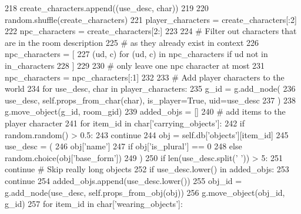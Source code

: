 \begin{DoxyCode}
218             create\_characters.append((use\_desc, char))
219 
220         random.shuffle(create\_characters)
221         player\_characters = create\_characters[:2]
222         npc\_characters = create\_characters[2:]
223 
224         \textcolor{comment}{# Filter out characters that are in the room description}
225         \textcolor{comment}{# as they already exist in context}
226         npc\_characters = [
227             (ud, c) \textcolor{keywordflow}{for} (ud, c) \textcolor{keywordflow}{in} npc\_characters \textcolor{keywordflow}{if} ud \textcolor{keywordflow}{not} \textcolor{keywordflow}{in} in\_characters
228         ]
229 
230         \textcolor{comment}{# only leave one npc character at most}
231         npc\_characters = npc\_characters[:1]
232 
233         \textcolor{comment}{# Add player characters to the world}
234         \textcolor{keywordflow}{for} use\_desc, char \textcolor{keywordflow}{in} player\_characters:
235             g\_id = g.add\_node(
236                 use\_desc, self.props\_from\_char(char), is\_player=\textcolor{keyword}{True}, uid=use\_desc
237             )
238             g.move\_object(g\_id, room\_gid)
239             added\_objs = []
240             \textcolor{comment}{# add items to the player character}
241             \textcolor{keywordflow}{for} item\_id \textcolor{keywordflow}{in} char[\textcolor{stringliteral}{'carrying\_objects'}]:
242                 \textcolor{keywordflow}{if} random.random() > 0.5:
243                     \textcolor{keywordflow}{continue}
244                 obj = self.db[\textcolor{stringliteral}{'objects'}][item\_id]
245                 use\_desc = (
246                     obj[\textcolor{stringliteral}{'name'}]
247                     \textcolor{keywordflow}{if} obj[\textcolor{stringliteral}{'is\_plural'}] == 0
248                     \textcolor{keywordflow}{else} random.choice(obj[\textcolor{stringliteral}{'base\_form'}])
249                 )
250                 \textcolor{keywordflow}{if} len(use\_desc.split(\textcolor{stringliteral}{' '})) > 5:
251                     \textcolor{keywordflow}{continue}  \textcolor{comment}{# Skip really long objects}
252                 \textcolor{keywordflow}{if} use\_desc.lower() \textcolor{keywordflow}{in} added\_objs:
253                     \textcolor{keywordflow}{continue}
254                 added\_objs.append(use\_desc.lower())
255                 obj\_id = g.add\_node(use\_desc, self.props\_from\_obj(obj))
256                 g.move\_object(obj\_id, g\_id)
257             \textcolor{keywordflow}{for} item\_id \textcolor{keywordflow}{in} char[\textcolor{stringliteral}{'wearing\_objects'}]:

\end{DoxyCode}
